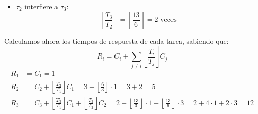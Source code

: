 \begin{ejercicio}
\begin{itemize}
        \item $\tau_2$ interfiere a $\tau_3$:
            \begin{equation*}
                \left\lfloor \frac{T_3}{T_2} \right\rfloor = \left\lfloor \frac{13}{6} \right\rfloor = 2\text{\ veces}
            \end{equation*}
    \end{itemize}
    Calculamos ahora los tiempos de respuesta de cada tarea, sabiendo que:
    \begin{equation*}
        R_i = C_i + \sum_{j\neq i} \left\lfloor \frac{T_i}{T_j} \right\rfloor C_j
    \end{equation*}
    \begin{align*}
        R_1 &= C_1 = 1 \\
        R_2 &= C_2 + \left\lfloor \frac{T_2}{T_1} \right\rfloor C_1 =  3 + \left\lfloor \frac{6}{3} \right\rfloor \cdot 1 = 3 + 2 = 5 \\
        R_3 &= C_3 + \left\lfloor \frac{T_3}{T_1} \right\rfloor C_1 + \left\lfloor \frac{T_3}{T_2} \right\rfloor C_2 =  2 + \left\lfloor \frac{13}{3} \right\rfloor \cdot 1 + \left\lfloor \frac{13}{6}\right\rfloor \cdot 3 = 2 + 4\cdot 1 + 2\cdot 3  = 12
    \end{align*}
\end{ejercicio}

